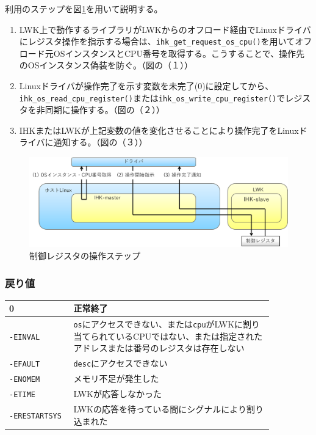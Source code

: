 \documentclass[twoside,11pt,fleqn]{book}
\begin{document}
利用のステップを図\ref{fig:cpu_register}を用いて説明する。
\begin{enumerate}
\item LWK上で動作するライブラリがLWKからのオフロード経由でLinuxドライバにレジスタ操作を指示する場合は、\texttt{ihk\_get\_request\_os\_cpu()}を用いてオフロード元OSインスタンスとCPU番号を取得する。こうすることで、操作先のOSインスタンス偽装を防ぐ。（図の（１））
\item Linuxドライバが操作完了を示す変数を未完了(0)に設定してから、\texttt{ihk\_os\_read\_cpu\_register()}または\texttt{ihk\_os\_write\_cpu\_register()}でレジスタを非同期に操作する。（図の（２））
\item IHKまたはLWKが上記変数の値を変化させることにより操作完了をLinuxドライバに通知する。（図の（３））
\end{enumerate}
%
\begin{figure}[!htb]
\centering
\includegraphics[width=14cm]{figs/cpu_register.pdf}
\vspace{-0em}\caption{制御レジスタの操作ステップ}
\label{fig:cpu_register}
\vspace{-0em}
\end{figure}
\FloatBarrier

\subsubsection*{戻り値}
\begin{table}[!h]
\footnotesize
\begin{tabular}{|p{0.20\linewidth}|p{0.66\linewidth}|} \hline
0&正常終了\\ \hline
\texttt{-EINVAL}&\texttt{os}にアクセスできない、または\texttt{cpu}がLWKに割り当てられているCPUではない、または指定されたアドレスまたは番号のレジスタは存在しない\\ \hline
\texttt{-EFAULT}&\texttt{desc}にアクセスできない\\ \hline
\verb:-ENOMEM:&メモリ不足が発生した\\ \hline
\verb:-ETIME:&LWKが応答しなかった\\ \hline
\verb:-ERESTARTSYS:&LWKの応答を待っている間にシグナルにより割り込まれた\\ \hline
\end{tabular}
\vspace{-0em}
\end{table}
\FloatBarrier
\end{document}
